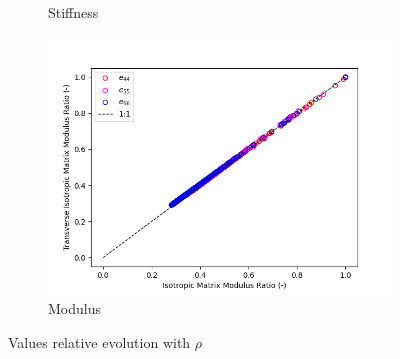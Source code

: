 \documentclass[a4paper,fleqn]{DC_ArtStyle}
\begin{document}
\begin{figure}
\begin{subfigure}[b]{0.45\linewidth}
			\caption{Stiffness}
		\end{subfigure}
		\begin{subfigure}[b]{0.45\linewidth}
			\includegraphics[width=\linewidth]{MuijModulus_Ratios}
			\caption{Modulus}
		\end{subfigure}
		\caption{Values relative evolution with $\rho$}
	\end{figure}



	\clearpage
\end{document}
